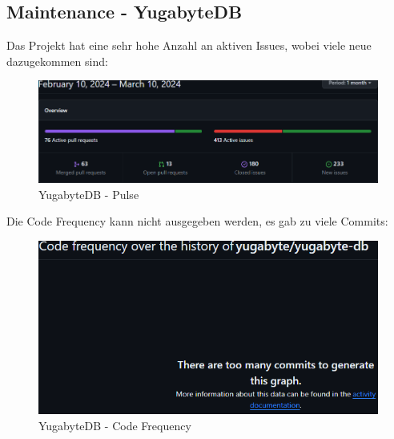
\begin{flushleft}
    \subsection{Maintenance - YugabyteDB}
    \label{subsec:maintenance_yugabytedb}
    Das Projekt hat eine sehr hohe Anzahl an aktiven Issues, wobei viele neue dazugekommen sind:
    \begin{figure}[H]
        \centering
        \includegraphics[width=0.75\linewidth]{source/implementation/evaluation/postgresql_ha_solutions/insights/yugabytedb/pulse_yugabyte_yugabyte-db}
        \caption{YugabyteDB - Pulse}
        \label{fig:pulse_yugabyte_yugabyte-db}
    \end{figure}

    Die Code Frequency kann nicht ausgegeben werden, es gab zu viele Commits:
    \begin{figure}[H]
        \centering
        \includegraphics[width=0.75\linewidth]{source/implementation/evaluation/postgresql_ha_solutions/insights/yugabytedb/code_frequency_yugabyte_yugabyte-db}
        \caption{YugabyteDB - Code Frequency}
        \label{fig:code_frequency_yugabyte_yugabyte-db}
    \end{figure}


\end{flushleft}
